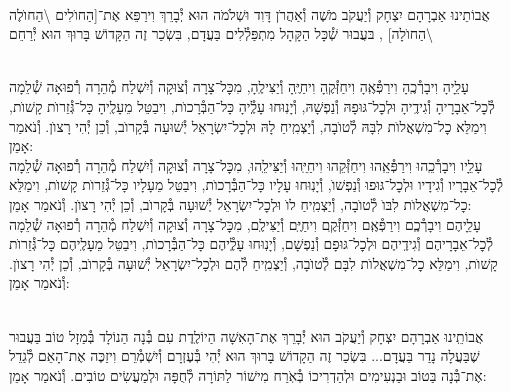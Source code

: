 \documentclass[twoside, openany, parskip=half, 11pt]{book}
\begin{document}
\begin{small}

\\
אֲבוֹתֵינוּ אַבְרָהָם יִצְחָק וְ֯יַעֲקֹב מֹשֶׁה וְ֯אַהֲרֹן דָּוִד וּשְׁלֹמֹה הוּא יְ֯בָרֵךְ וִירַפֵּא אֶת־[הַחוׂלִים \textbackslash הַחוׂלֶה \textbackslash הַחוׂלָה]
,
בּעֲבוּר שְׁ֯כָּל הַקָּהָל מִתְפַּלְ֯לִים בַּעֲדָם, בִּשְׂכַר זֶה
הַקָּדוֹשׁ בָּרוּךְ הוּא יְ֯רַחֵם
\setcolumnwidth{1.4in,1.4in,1.4in}
\begin{paracol}{3}
\\
עָלֵָיהָ וִיבָרְ֯כֶֽהָ וִירַפְּ֯אֶֽהָ וִיחַזְּ֯קֶֽהָ וִיחַיֶּֽהָ וְ֯יַצִּילֶֽהָ, מִכׇּל־צָרָה וְ֯צוּקָה וְ֯יִשְׁלַח מְ֯הֵרָה רְ֯פוּאָה שְׁ֯לֵמָה לְ֯כׇל־אֵבָרָיהָ וְ֯גִידֶֽיהָ וּלְכׇל־גּוּפָהּ וְ֯נַפְשָׁהּ, וְ֯יָנֽוּחוּ עָלְֶ֯יהָ כָּל־הַבְּ֯רָכוׂת, וִיבַטֵּל מֵעָלֶֽיהָ כָּל־גְּ֯זֵרוׂת קָשׁוׂת, וִימַלֵּא כׇל־מִשְׁאֲלוׂת לִבָּהּ לְ֯טוׂבָה, וְ֯יַצְמִֽיחַ לָהּ וּלְכׇל־יִשְׂרָאֵל יְ֯שׁוּעָה בְּ֯קָרוׂב, וְ֯כֵן יְ֯הִי רָצוׂן. וְ֯נֹאמַר אָמֵן:
\switchcolumn
{}\\
עָלֵָיו וִיבָרְ֯כֵֽהוּ וִירַפְּ֯אֵֽהוּ וִיחַזְּ֯קֵהוּ וִיחַיֵּֽהוּ וְ֯יַצִּילֵֽהוּ, מִכׇּל־צָרָה וְ֯צוּקָה וְ֯יִשְׁלַח מְ֯הֵרָה רְ֯פוּאָה שְׁ֯לֵמָה לְ֯כׇל־אֵבָרָיו וְ֯גִידָיו וּלְכׇל־גּוּפוּ וְ֯נַפְשׁוׂ, וְ֯יָנֽוּחוּ עָלָיו כָּל־הַבְּ֯רָכוׂת, וִיבַטֵּל מֵעָלָיו כָּל־גְּ֯זֵרוׂת קָשׁוׂת, וִימַלֵּא כׇל־מִשְׁאֲלוׂת לִבּוׂ לְ֯טוׂבָה, וְ֯יַצְמִֽיחַ לוׂ וּלְכׇל־יִשְׂרָאֵל יְ֯שׁוּעָה בְּ֯קָרוׂב, וְ֯כֵן יְ֯הִי רָצוׂן. וְ֯נֹאמַר אָמֵן:
\switchcolumn
{}\\
עָלֵָיהֶם וִיבָרְ֯כְֶם וִירַפְּ֯אֶֽם וִיחַזְּ֯קֶֽם וִיחַיֶּֽם וְ֯יַצִּילֶֽם, מִכׇּל־צָרָה וְ֯צוּקָה וְ֯יִשְׁלַח מְ֯הֵרָה רְ֯פוּאָה שְׁ֯לֵמָה לְ֯כׇל־אֵבָרָיהֶם וְ֯גִידֶֽיהֶם וּלְכׇל־גּוּפָם וְ֯נַפְשָׁם, וְ֯יָנֽוּחוּ עָלְֶ֯יהֶם כָּל־הַבְּ֯רָכוׂת, וִיבַטֵּל מֵעָלֶֽיהֶם כָּל־גְּ֯זֵרוׂת קָשׁוׂת, וִימַלֵּא כׇל־מִשְׁאֲלוׂת לִבָּם לְ֯טוׂבָה, וְ֯יַצְמִֽיחַ לְ֯הֶם וּלְכׇל־יִשְׂרָאֵל יְ֯שׁוּעָה בְּ֯קָרוׂב, וְ֯כֵן יְ֯הִי רָצוׂן. וְ֯נֹאמַר אָמֵן:
\end{paracol}

\vspace{\baselineskip}

\\
אֲבוֹתֵֽינוּ אַבְרָהָם יִצְחָק וְ֯יַעֲקֹב הוּא יְ֯בָרֵךְ אֶת־הָאִשָׁה הַיוֹלֶֽדֶת
עִם בְּ֯נָה הַנוֹלָד בְּ֯מַזָל טוֹב בַּעֲבוּר שֶׁבַּעֲלָה נָדַר בַּעֲדָם... בִּשְׂכַר זֶה הַקָדוֹשׁ בָּרוּךְ הוּא יְ֯הִי בְּ֯עֶזְרָם וְ֯יִשְׁמְ֯רֵם וִיזַכֶּה אֶת־הָאֵם לְ֯גַדֵל אֶת־בְּ֯נָה בַּטוֹב וּבַנְעִימִים וּלְהַדְרִיכוֹ בְּ֯אֹֽרַח מִישׁוֹר לַתּוֹרָה לְ֯חֻפָּה וּלְמַעֲשִׂים טוֹבִים. וְ֯נֹאמַר אָמֵן:


\end{small}
\end{document}
